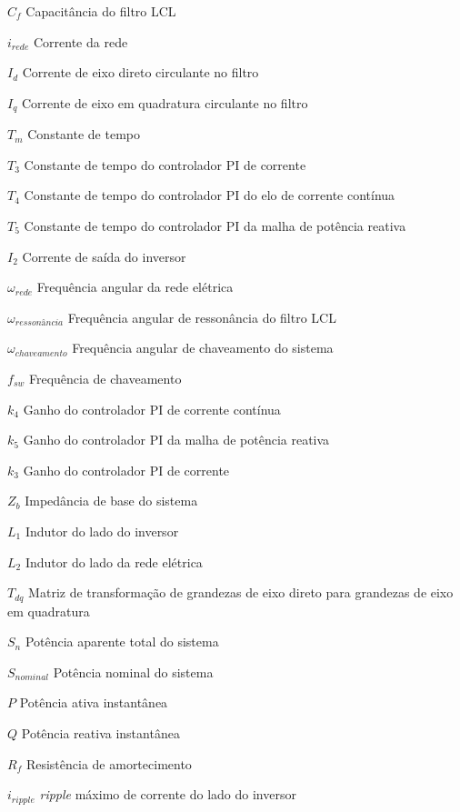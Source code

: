 \begin{simbolos}
  \item[$ C_f $] Capacitância do filtro LCL
  \item[$ i_{rede} $] Corrente da rede
  \item[$ I_d $] Corrente de eixo direto circulante no filtro
  \item[$ I_q $] Corrente de eixo em quadratura circulante no filtro
  \item[$ T_m $] Constante de tempo
  \item[$ T_3 $] Constante de tempo do controlador PI de corrente
  \item[$ T_4 $] Constante de tempo do controlador PI do elo de corrente contínua
  \item[$ T_5 $] Constante de tempo do controlador PI da malha de potência reativa
  \item[$ I_2 $] Corrente de saída do inversor
  \item[$ \omega_{rede} $] Frequência angular da rede elétrica
  \item[$ \omega_{ressonância} $] Frequência angular de ressonância do filtro LCL
  \item[$ \omega_{chaveamento} $] Frequência angular de chaveamento do sistema
  \item[$ f_{sw} $] Frequência de chaveamento
  \item[$ k_4 $] Ganho do controlador PI de corrente contínua
  \item[$ k_5 $] Ganho do controlador PI da malha de potência reativa
  \item[$ k_3 $] Ganho do controlador PI de corrente
  \item[$ Z_b $] Impedância de base do sistema
  \item[$ L_1 $] Indutor do lado do inversor
  \item[$ L_2 $] Indutor do lado da rede elétrica
  \item[$ T_{dq} $] Matriz de transformação de grandezas de eixo direto para grandezas de eixo em quadratura
  \item[$ S_n $] Potência aparente total do sistema
  \item[$ S_{nominal} $] Potência nominal do sistema
  \item[$ P $] Potência ativa instantânea
  \item[$ Q $] Potência reativa instantânea
  \item[$ R_f $] Resistência de amortecimento
  \item[$ i_{ripple} $] \textit{ripple} máximo de corrente do lado do inversor

\end{simbolos}

